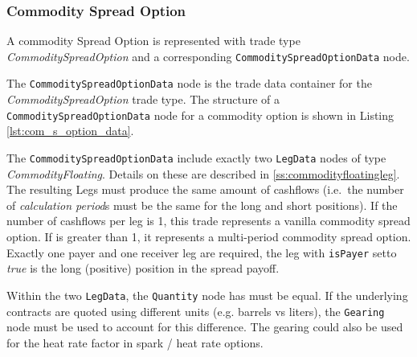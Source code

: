 \subsubsection{Commodity Spread Option}
\label{ss:input_commodity_spread_option}

A commodity Spread Option is represented with trade type  \emph{CommoditySpreadOption} and a corresponding
\lstinline!CommoditySpreadOptionData! node.

The \lstinline!CommoditySpreadOptionData! node is the trade data container for the \emph{CommoditySpreadOption} trade type.
The structure of a \lstinline!CommoditySpreadOptionData! node for a commodity option is shown in Listing \ref{lst:com_s_option_data}.

The \lstinline!CommoditySpreadOptionData! include exactly two \lstinline!LegData! nodes of type \emph{CommodityFloating}.
Details on these are described in \ref{ss:commodityfloatingleg}.
The resulting Legs must produce the same amount of cashflows (i.e.~the number of \emph{calculation period}s must be the same for the long and short positions).
If the number of cashflows per leg is 1, this trade represents a vanilla commodity spread option.
If is greater than 1, it represents a multi-period commodity spread option.
Exactly one payer and one receiver leg are required, the leg with \lstinline!isPayer! setto \emph{true} is the long (positive) position in the spread payoff. 

Within the two \lstinline!LegData!, the \lstinline!Quantity! node has must be equal.
If the underlying contracts are quoted using different units (e.g. barrels vs liters), the \lstinline!Gearing! node must be used to account for this difference. The gearing could also be used for the heat rate factor in spark / heat rate options.

